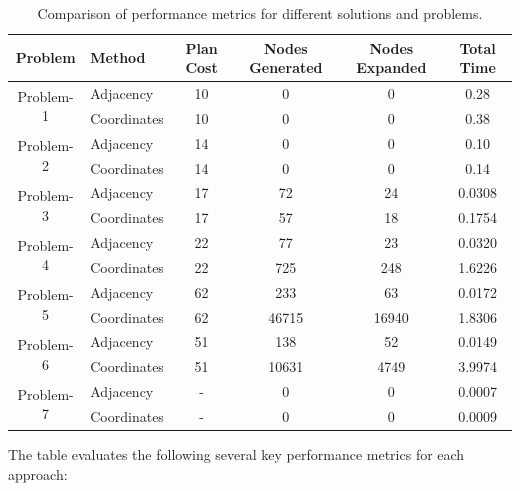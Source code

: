 \documentclass{article}
\begin{document}
\begin{table}[ht]
    \centering
    \small
    \begin{tabular}{|c|l|c|c|c|c|}
        \hline
        \textbf{Problem} & \textbf{Method} & \textbf{Plan Cost} & \textbf{Nodes Generated} & \textbf{Nodes Expanded} & \textbf{Total Time} \\
        \hline
        \multirow{2}{*}{Problem-1} & Adjacency & 10 & 0 & 0 & 0.28 \\
                                   & Coordinates & 10 & 0 & 0 & 0.38 \\
        \hline
        \multirow{2}{*}{Problem-2} & Adjacency & 14 & 0 & 0 & 0.10 \\
                                   & Coordinates & 14 & 0 & 0 & 0.14 \\
        \hline
        \multirow{2}{*}{Problem-3} & Adjacency & 17 & 72 & 24 & 0.0308 \\
                                   & Coordinates & 17 & 57 & 18 & 0.1754 \\
        \hline
        \multirow{2}{*}{Problem-4} & Adjacency & 22 & 77 & 23 & 0.0320 \\
                                   & Coordinates & 22 & 725 & 248 & 1.6226 \\
        \hline
        \multirow{2}{*}{Problem-5} & Adjacency & 62 & 233 & 63 & 0.0172 \\
                                   & Coordinates & 62 & 46715 & 16940 & 1.8306 \\
        \hline
        \multirow{2}{*}{Problem-6} & Adjacency & 51 & 138 & 52 & 0.0149 \\
                                   & Coordinates & 51 & 10631 & 4749 & 3.9974 \\
        \hline
        \multirow{2}{*}{Problem-7} & Adjacency & - & 0 & 0 & 0.0007 \\
                                   & Coordinates & - & 0 & 0 & 0.0009 \\
        \hline
    \end{tabular}
    \caption{Comparison of performance metrics for different solutions and problems.}
    \label{tab:results}
\end{table}

The table evaluates the following several key performance metrics for each approach:
\end{document}

